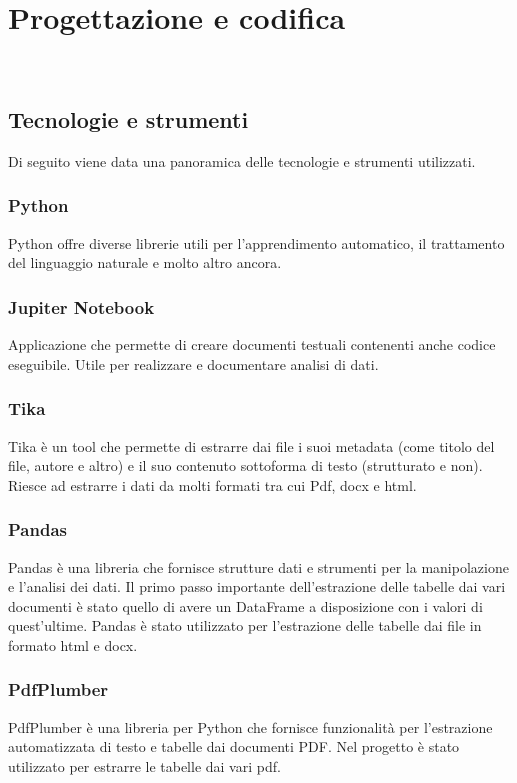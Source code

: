 \chapter{Progettazione e codifica}
\label{cap:progettazione-codifica}

\\

\section{Tecnologie e strumenti}
\label{sec:tecnologie-strumenti}

Di seguito viene data una panoramica delle tecnologie e strumenti utilizzati.
\subsection{Python}
Python offre diverse librerie utili per l'apprendimento automatico, il trattamento del linguaggio naturale e molto altro ancora.
\subsection{Jupiter Notebook}
Applicazione che permette di creare documenti testuali contenenti anche codice eseguibile. Utile per realizzare e documentare analisi di dati.
\subsection{Tika}
\label{subsec:tika}
Tika è un tool che permette di estrarre dai file i suoi metadata (come titolo del file, autore e altro) e il suo contenuto sottoforma di testo (strutturato e non).
Riesce ad estrarre i dati da molti formati tra cui Pdf, docx e html.
\subsection{Pandas}
Pandas è una libreria che fornisce strutture dati e strumenti per la manipolazione e l'analisi dei dati.
Il primo passo importante dell'estrazione delle tabelle dai vari documenti è stato quello di avere un DataFrame a disposizione con i valori di quest'ultime. 
Pandas è stato utilizzato per l'estrazione delle tabelle dai file in formato html e docx.
\subsection{PdfPlumber}
PdfPlumber è una libreria per Python che fornisce funzionalità per l'estrazione automatizzata di testo e tabelle dai documenti PDF.
Nel progetto è stato utilizzato per estrarre le tabelle dai vari pdf.

